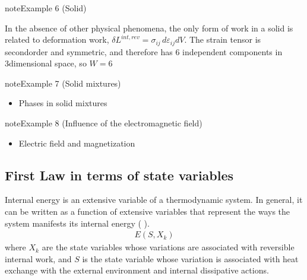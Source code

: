 \documentclass[letterpaper,10pt,english]{jupyterBook}
\begin{document}
\label{ch/principles-gibbs-phase-rule:example-9}
\begin{sphinxadmonition}{note}{Example 6 (Solid)}



\sphinxAtStartPar
In the absence of other physical phenomena, the only form of work in a solid is related to deformation work, \(\delta L^{int,rev} = \sigma_{ij} \, d \varepsilon_{ij} dV\). The strain tensor is second\sphinxhyphen{}order and symmetric, and therefore has 6 independent components in 3\sphinxhyphen{}dimensional space, so \(W=6\)
\end{sphinxadmonition}
\label{ch/principles-gibbs-phase-rule:example-10}
\begin{sphinxadmonition}{note}{Example 7 (Solid mixtures)}


\begin{itemize}
\item {} 
\sphinxAtStartPar
Phases in solid mixtures 

\end{itemize}
\end{sphinxadmonition}
\label{ch/principles-gibbs-phase-rule:example-11}
\begin{sphinxadmonition}{note}{Example 8 (Influence of the electromagnetic field)}


\begin{itemize}
\item {} 
\sphinxAtStartPar
Electric field and magnetization 

\end{itemize}
\end{sphinxadmonition}


\subsection{First Law in terms of state variables}
\label{\detokenize{ch/principles-gibbs-phase-rule:first-law-in-terms-of-state-variables}}\label{\detokenize{ch/principles-gibbs-phase-rule:physics-hs-thermodynamics-foundation-principles-gibbs-phase-rule-first}}
\sphinxAtStartPar
Internal energy is an extensive variable of a thermodynamic system. In general, it can be written as a function of extensive variables that represent the ways the system manifests its internal energy ( ).
\begin{equation*}
\begin{split}E(S, X_k)\end{split}
\end{equation*}
\sphinxAtStartPar
where \( X_k \) are the state variables whose variations are associated with reversible internal work, and \( S \) is the state variable whose variation is associated with heat exchange with the external environment and internal dissipative actions.  
\end{document}
